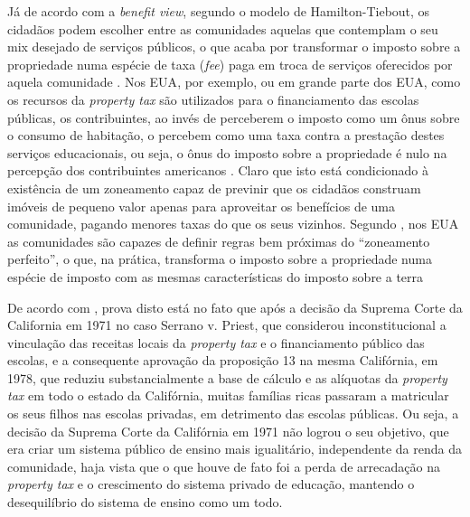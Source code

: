 \documentclass[
	12pt,				%
	oneside,			%
	a4paper,			%
	chapter=TITLE,		%
	section=TITLE,		%
	english,			%
	brazil				%
	]{abntex2}
\begin{document}
\begin{refsection}
Já de acordo com a \emph{benefit view}, segundo o modelo de Hamilton-Tiebout, os
cidadãos podem escolher entre as comunidades aquelas que contemplam o seu mix
desejado de serviços públicos, o que acaba por transformar o imposto sobre a
propriedade numa espécie de taxa (\emph{fee}) paga em troca de serviços oferecidos
por aquela comunidade \autocite[166]{fischel2015}. Nos \gls{EUA}, por exemplo, ou em
grande parte dos \gls{EUA}, como os recursos da \emph{property tax} são utilizados
para o financiamento das escolas públicas, os contribuintes, ao invés de
perceberem o imposto como um ônus sobre o consumo de habitação, o percebem como
uma taxa contra a prestação destes serviços educacionais, ou seja, o ônus do
imposto sobre a propriedade é nulo na percepção dos contribuintes americanos
\autocites[p.~468]{fischel1989}[p.~20]{fischel2013}. Claro que isto está condicionado à
existência de um zoneamento capaz de previnir que os cidadãos construam imóveis
de pequeno valor apenas para aproveitar os benefícios de uma comunidade, pagando
menores taxas do que os seus vizinhos. Segundo \textcite[p.~165]{fischel2015}, nos
\gls{EUA} as comunidades são capazes de definir regras bem próximas do
``zoneamento perfeito'', o que, na prática, transforma o imposto sobre a
propriedade numa espécie de imposto com as mesmas características do imposto
sobre a terra

De acordo com \textcite[p.~180]{fischel2015}, prova disto está no fato que após a decisão
da Suprema Corte da California em 1971 no caso Serrano v. Priest, que considerou
inconstitucional a vinculação das receitas locais da \emph{property tax} e o
financiamento público das escolas, e a consequente aprovação da proposição 13 na
mesma Califórnia, em 1978, que reduziu substancialmente a base de cálculo e as
alíquotas da \emph{property tax} em todo o estado da Califórnia, muitas famílias
ricas passaram a matricular os seus filhos nas escolas privadas, em detrimento
das escolas públicas. Ou seja, a decisão da Suprema Corte da Califórnia em 1971
não logrou o seu objetivo, que era criar um sistema público de ensino mais
igualitário, independente da renda da comunidade, haja vista que o que houve de
fato foi a perda de arrecadação na \emph{property tax} e o crescimento do sistema
privado de educação, mantendo o desequilíbrio do sistema de ensino como um todo.


\end{refsection}
\end{document}
